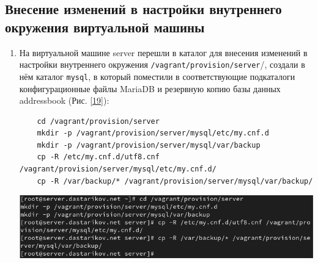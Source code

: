 \subsection{Внесение изменений в настройки внутреннего окружения виртуальной машины}
\begin{enumerate}
\item На виртуальной машине server перешли в каталог для внесения изменений в настройки внутреннего окружения \texttt{/vagrant/provision/server}/, создали в нём каталог \texttt{mysql}, в который поместили в соответствующие подкаталоги конфигурационные файлы MariaDB и резервную копию базы данных addressbook (Рис. \ref{19}):
  \begin{verbatim}
    cd /vagrant/provision/server
    mkdir -p /vagrant/provision/server/mysql/etc/my.cnf.d
    mkdir -p /vagrant/provision/server/mysql/var/backup
    cp -R /etc/my.cnf.d/utf8.cnf /vagrant/provision/server/mysql/etc/my.cnf.d/
    cp -R /var/backup/* /vagrant/provision/server/mysql/var/backup/
  \end{verbatim}

\begin{center}
    \centering
    \includegraphics[width=\textwidth]{../images/image19.png}
    \label{19}
\end{center}


\end{enumerate}
